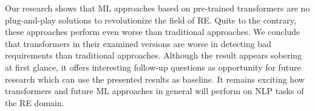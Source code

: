 Our research shows that \ac{ML} approaches based on pre-trained transformers are no plug-and-play solutions to revolutionize the field of \ac{RE}.
Quite to the contrary, these approaches perform even worse than traditional approaches.
We conclude that transformers in their examined versions are worse in detecting bad requirements than traditional approaches.
Although the result appears sobering at first glance, it offers interesting follow-up questions as opportunity for future research which can use the presented results as baseline.
It remains exciting how transformers and future \ac{ML} approaches in general will perform on \ac{NLP} tasks of the \ac{RE} domain.
